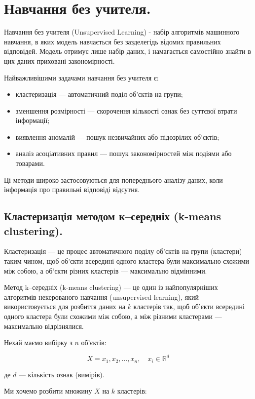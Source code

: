 \chapter{Навчання без учителя.}

Навчання без учителя (Unsupervised Learning) - набір алгоритмів машинного навчання, в яких модель навчається без зазделегідь відомих правильних відповідей. Модель отримує лише набір даних, і намагається самостійно знайти в цих даних приховані закономірності.

Найважливішими задачами навчання без учителя є:

\begin{itemize}
\item кластеризація — автоматичний поділ об'єктів на групи;
\item зменшення розмірності — скорочення кількості ознак без суттєвої втрати інформації;
\item виявлення аномалій — пошук незвичайних або підозрілих об'єктів;
\item аналіз асоціативних правил — пошук закономірностей між подіями або товарами.
\end{itemize}

Ці методи широко застосовуються для попереднього аналізу даних, коли інформація про правильні відповіді відсутня.

\section{Кластеризація методом к–середніх (k-means clustering).}

Кластеризація — це процес автоматичного поділу об'єктів на групи (кластери) таким чином, щоб об'єкти всередині одного кластера були максимально схожими між собою, а об'єкти різних кластерів — максимально відмінними.

Метод k–середніх (k-means clustering) — це один із найпопулярніших алгоритмів некерованого навчання (unsupervised learning), який використовується для розбиття даних на $k$ кластерів так, щоб об’єкти всередині одного кластера були схожими між собою, а між різними кластерами — максимально відрізнялися.

Нехай маємо вибірку з $ n $ об’єктів:

$$
X = {x_1, x_2, \ldots, x_n}, \quad x_i \in \mathbb{R}^d
$$

де $ d $ — кількість ознак (вимірів).

Ми хочемо розбити множину $ X $ на $ k $ кластерів:

